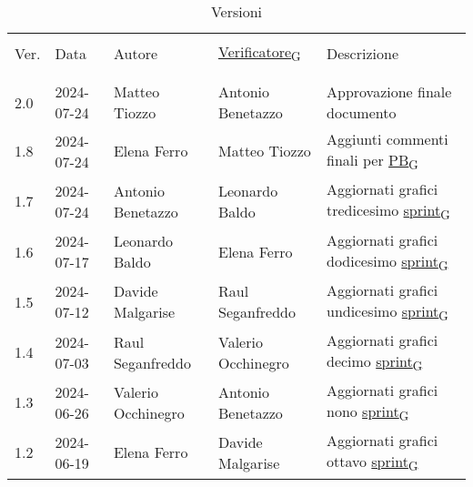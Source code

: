 \documentclass[italian,12pt]{article} %
\begin{document}

\newpage

\captionsetup[table]{list=no}
\begin{table}[!h]
	\caption*{Versioni}
	\footnotesize
	\begin{center}
		\begin{tabular}{ l l l l p{6cm} }
			\hline                                                                                                                   \\[-2ex]
			Ver. & Data       & Autore             & \href{https://7last.github.io/docs/pb/documentazione-interna/glossario\#verificatore}{Verificatore\textsubscript{G}}       & Descrizione                                                \\
			\\[-2ex] \hline \\[-1.5ex]
			2.0  & 2024-07-24 & Matteo Tiozzo      & Antonio Benetazzo  & Approvazione finale documento \\
			1.8  & 2024-07-24 & Elena Ferro        & Matteo Tiozzo      & Aggiunti commenti finali per \href{https://7last.github.io/docs/pb/documentazione-interna/glossario\#product-baseline}{PB\textsubscript{G}} \\
			1.7  & 2024-07-24 & Antonio Benetazzo  & Leonardo Baldo     & Aggiornati grafici tredicesimo \href{https://7last.github.io/docs/pb/documentazione-interna/glossario\#sprint}{sprint\textsubscript{G}} \\
			1.6  & 2024-07-17 & Leonardo Baldo     & Elena Ferro        & Aggiornati grafici dodicesimo \href{https://7last.github.io/docs/pb/documentazione-interna/glossario\#sprint}{sprint\textsubscript{G}} \\
			1.5  & 2024-07-12 & Davide Malgarise   & Raul Seganfreddo   & Aggiornati grafici undicesimo \href{https://7last.github.io/docs/pb/documentazione-interna/glossario\#sprint}{sprint\textsubscript{G}} \\
			1.4  & 2024-07-03 & Raul Seganfreddo   & Valerio Occhinegro & Aggiornati grafici decimo \href{https://7last.github.io/docs/pb/documentazione-interna/glossario\#sprint}{sprint\textsubscript{G}} \\
			1.3  & 2024-06-26 & Valerio Occhinegro & Antonio Benetazzo  & Aggiornati grafici nono \href{https://7last.github.io/docs/pb/documentazione-interna/glossario\#sprint}{sprint\textsubscript{G}} \\
			1.2  & 2024-06-19 & Elena Ferro        & Davide Malgarise   & Aggiornati grafici ottavo \href{https://7last.github.io/docs/pb/documentazione-interna/glossario\#sprint}{sprint\textsubscript{G}} \\

\end{tabular}
\end{center}
\end{table}
\end{document}
